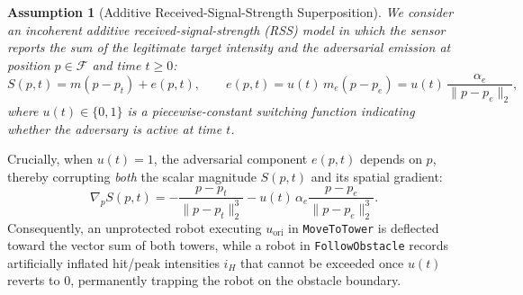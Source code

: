 \documentclass[12pt, a4paper]{article}
\newtheorem{assumption}{Assumption}
\begin{document}
\begin{assumption}[Additive Received-Signal-Strength Superposition]
\label{assump:superposition}
We consider an incoherent additive received-signal-strength (RSS) model in which the sensor reports the sum of the legitimate target intensity and the adversarial emission at position $p \in \mathcal{F}$ and time $t \ge 0$:
\begin{equation}
    S(p, t) = m(p - p_t) + e(p, t), \qquad e(p, t) = u(t)\, m_e(p - p_e) = u(t)\, \frac{\alpha_e}{\|p - p_e\|_2},
    \label{eq:superposition}
\end{equation}
where $u(t) \in \{0, 1\}$ is a piecewise-constant switching function indicating whether the adversary is active at time $t$.
\end{assumption}

Crucially, when $u(t) = 1$, the adversarial component $e(p, t)$ depends on $p$, thereby corrupting \emph{both} the scalar magnitude $S(p, t)$ and its spatial gradient:
\begin{equation}
    \nabla_p S(p, t) = -\frac{p - p_t}{\|p - p_t\|_2^3} - u(t)\,\alpha_e \frac{p - p_e}{\|p - p_e\|_2^3}.
    \label{eq:corrupted_gradient}
\end{equation}
Consequently, an unprotected robot executing $u_{\text{ori}}$ in \texttt{MoveToTower} is deflected toward the vector sum of both towers, while a robot in \texttt{FollowObstacle} records artificially inflated hit/peak intensities $i_H$ that cannot be exceeded once $u(t)$ reverts to $0$, permanently trapping the robot on the obstacle boundary.
\end{document}
